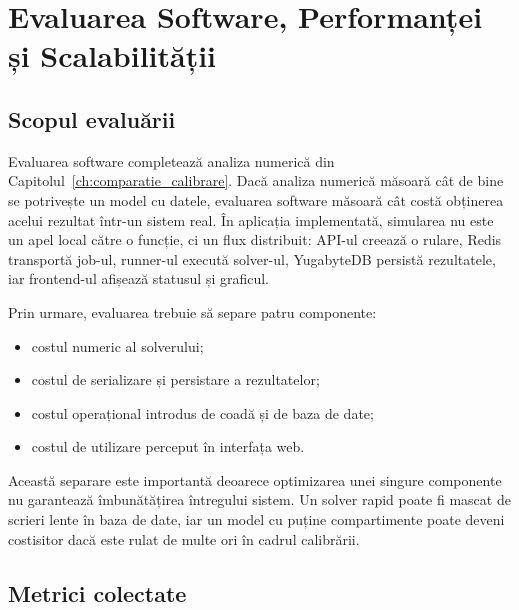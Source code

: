
\chapter{Evaluarea Software, Performanței și Scalabilității}
\label{ch:evaluare}

\section{Scopul evaluării}
\label{sec:scop_evaluare_software}

Evaluarea software completează analiza numerică din
Capitolul~\ref{ch:comparatie_calibrare}. Dacă analiza numerică măsoară cât de
bine se potrivește un model cu datele, evaluarea software măsoară cât costă
obținerea acelui rezultat într-un sistem real. În aplicația implementată,
simularea nu este un apel local către o funcție, ci un flux distribuit: API-ul
creează o rulare, Redis transportă job-ul, runner-ul execută solver-ul,
YugabyteDB persistă rezultatele, iar frontend-ul afișează statusul și graficul.

Prin urmare, evaluarea trebuie să separe patru componente:
\begin{itemize}
    \item costul numeric al solverului;
    \item costul de serializare și persistare a rezultatelor;
    \item costul operațional introdus de coadă și de baza de date;
    \item costul de utilizare perceput în interfața web.
\end{itemize}

Această separare este importantă deoarece optimizarea unei singure componente nu
garantează îmbunătățirea întregului sistem. Un solver rapid poate fi mascat de
scrieri lente în baza de date, iar un model cu puține compartimente poate deveni
costisitor dacă este rulat de multe ori în cadrul calibrării.

\section{Metrici colectate}
\label{subsec:metrici}

